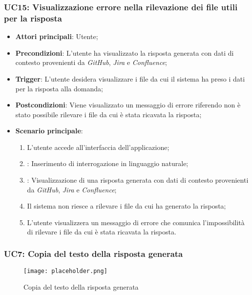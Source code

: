 \subsubsection{UC15: Visualizzazione errore nella rilevazione dei file utili per la risposta}
\begin{itemize}
    \item \textbf{Attori principali}: Utente;
    \item \textbf{Precondizioni}: L'utente ha visualizzato la risposta generata con dati di contesto provenienti da \emph{GitHub}, \emph{Jira} e \emph{Confluence};
    \item \textbf{Trigger}: L'utente desidera visualizzare i file da cui il sistema ha preso i dati per la risposta alla domanda;
    \item \textbf{Postcondizioni}: Viene visualizzato un messaggio di errore riferendo non è stato possibile rilevare i file da cui è stata ricavata la risposta;
    \item \textbf{Scenario principale}: 
    \begin{enumerate}
        \item L'utente accede all'interfaccia dell'applicazione;
        \item {}: Inserimento di interrogazione in linguaggio naturale;
        \item {}: Visualizzazione di una risposta generata con dati di contesto provenienti da \emph{GitHub}, \emph{Jira} e \emph{Confluence};
        \item Il sistema non riesce a rilevare i file da cui ha generato la risposta;
        \item L'utente visualizzera un messaggio di errore che comunica l'impossibilità di rilevare i file da cui è stata ricavata la risposta.
    \end{enumerate}
\end{itemize}


\hypertarget{UC7}{}
\subsubsection{UC7: Copia del testo della risposta generata}

\begin{figure}[h]
    \centering
    \texttt{[image: placeholder.png]}
    \caption{Copia del testo della risposta generata}
\end{figure}

